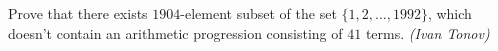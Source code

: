 Prove that there exists $1904$-element subset of the set $\{1,2,\ldots,1992\}$, which doesn’t contain an arithmetic progression consisting of $41$ terms. \textit{(Ivan Tonov)}